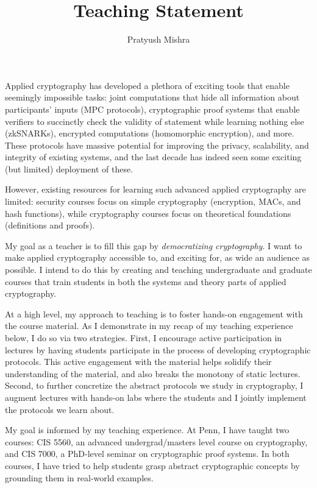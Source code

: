 \documentclass[11pt,letterpaper]{article}
\begin{document}

\title{Teaching Statement}
\author{Pratyush Mishra}
\date{}

\maketitle
\vspace{-2em}

Applied cryptography has developed a plethora of exciting tools that enable seemingly impossible tasks: joint computations that hide all information about participants' inputs (MPC protocols), cryptographic proof systems that enable verifiers to succinctly check the validity of statement while learning nothing else (zkSNARKs), encrypted computations (homomorphic encryption), and more. These protocols have massive potential for improving the privacy, scalability, and integrity of existing systems, and the last decade has indeed seen some exciting (but limited) deployment of these. 

However, existing resources for learning such advanced applied cryptography are limited: security courses focus on simple cryptography (encryption, MACs, and hash functions), while cryptography courses focus on theoretical foundations (definitions and proofs).

My goal as a teacher is to fill this gap by \emph{democratizing cryptography}. I want to make applied cryptography accessible to, and exciting for, as wide an audience as possible. I intend to do this by creating and teaching undergraduate and graduate courses that train students in both the systems and theory parts of applied cryptography.

At a high level, my approach to teaching is to foster hands-on engagement with the course material.
As I demonstrate in my recap of my teaching experience below, I do so via two strategies.
First, I encourage active participation in lectures by having students participate in the process of developing cryptographic protocols.
This active engagement with the material helps solidify their understanding of the material, and also breaks the monotony of static lectures.
Second, to further concretize the abstract protocols we study in cryptography, I augment lectures with hands-on labs where the students and I jointly implement the protocols we learn about.


My goal is informed by my teaching experience. At Penn, I have taught two courses: CIS 5560, an advanced undergrad/masters level course on cryptography, and CIS 7000, a PhD-level seminar on cryptographic proof systems.
In both courses, I have tried to help students grasp abstract cryptographic concepts by grounding them in real-world examples.
\end{document}
